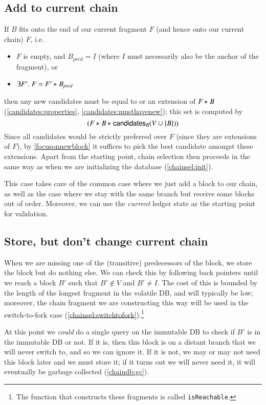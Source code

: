 \subsection{Add to current chain}
\label{chainsel:addtochain}

If $B$ fits onto the end of our current fragment $F$ (and hence onto our current chain) $F$, i.e.
%
\begin{itemize}
\item $F$ is empty, and $B_\mathit{pred} = I$
(where $I$ must necessarily also be the anchor of the fragment), or
\item $\exists F' .\; F = F' \mathrel{\triangleright} B_\mathit{pred}$
\end{itemize}
%
then any new candidates must be equal to or an extension of $F \mathrel{\triangleright} B$
(\cref{candidates:properties}, \cref{candidates:musthavenew}); this set is
computed by
%
\begin{equation*}
(F \mathrel{\triangleright} B \mathrel{\triangleright} \mathsf{candidates}_B(V \cup \{B\}))
\end{equation*}
%
Since all candidates would be strictly preferred over $F$ (since they are
extensions of $F$), by \cref{focusonnewblock} it suffices to pick the best
candidate amongst these extensions. Apart from the starting point, chain
selection then proceeds in the same way as when we are initializing the database
(\cref{chainsel:init}).

This case takes care of the common case where we just add a block to our chain,
as well as the case where we stay with the same branch but receive some blocks
out of order. Moreover, we can use the \emph{current} ledger state as the
starting point for validation.

\subsection{Store, but don't change current chain}

When we are missing one of the (transitive) predecessors of the block, we store
the block but do nothing else. We can check this by following back pointers
until we reach a block $B'$ such that $B' \notin V$ and $B' \neq I$. The cost of
this is bounded by the length of the longest fragment in the volatile DB, and
will typically be low; moreover, the chain fragment we are constructing this way
will be used in the switch-to-fork case
(\cref{chainsel:switchtofork}).\footnote{The function that constructs these
fragments is called \lstinline!isReachable!.}

At this point we \emph{could} do a single query on the immutable DB to check if
$B'$ is in the immutable DB or not. If it is, then this block is on a distant
branch that we will never switch to, and so we can ignore it. If it is not, we
may or may not need this block later and we must store it; if it turns out we
will never need it, it will eventually be garbage collected (\cref{chaindb:gc}).

